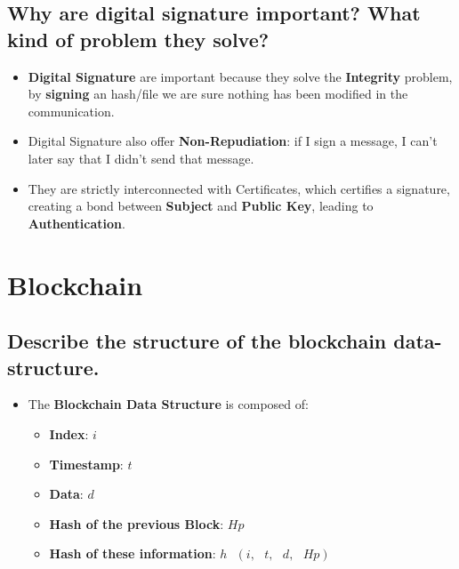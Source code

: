 \documentclass[9pt, letterpaper]{article}
\begin{document}
\subsection{Why are digital signature important? What kind of problem they solve?}
\begin{itemize}
	\item \textbf{Digital Signature} are important because they solve the \textbf{Integrity} problem, by \textbf{signing} an hash/file we are sure nothing has been modified in the communication.
	\item Digital Signature also offer \textbf{Non-Repudiation}: if I sign a message, I can't later say that I didn't send that message.
	\item They are strictly interconnected with Certificates, which certifies a signature, creating a bond between \textbf{Subject} and \textbf{Public Key}, leading to \textbf{Authentication}.
\end{itemize}






\section{Blockchain}

\subsection{Describe the structure of the blockchain data-structure.}
\begin{itemize}
	\item The \textbf{Blockchain Data Structure} is composed of:
	      \begin{itemize}
		      \item \textbf{Index}: $i$
		      \item \textbf{Timestamp}: $t$
		      \item \textbf{Data}: $d$
		      \item \textbf{Hash of the previous Block}: $Hp$
		      \item \textbf{Hash of these information}: $h \mbox{ } (i,\mbox{ } t,\mbox{  } d,\mbox{  } Hp)$
	      \end{itemize}
\end{itemize}
\end{document}

